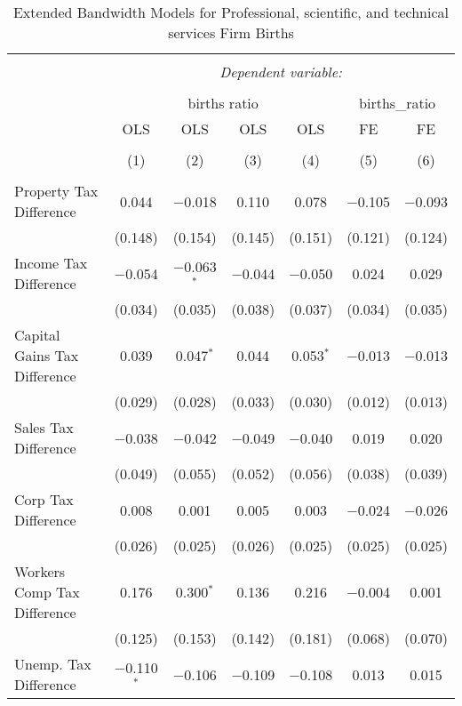 
\begin{table}[!htbp] \centering 
  \caption{Extended Bandwidth Models for  Professional, scientific, and technical services Firm Births} 
  \label{54eb} 
\begin{tabular}{@{\extracolsep{5pt}}lcccccc} 
\\[-1.8ex]\hline 
\hline \\[-1.8ex] 
 & \multicolumn{6}{c}{\textit{Dependent variable:}} \\ 
\cline{2-7} 
\\[-1.8ex] & \multicolumn{4}{c}{births ratio} & \multicolumn{2}{c}{births\_ratio} \\ 
 & OLS & OLS & OLS & OLS & FE & FE \\ 
\\[-1.8ex] & (1) & (2) & (3) & (4) & (5) & (6)\\ 
\hline \\[-1.8ex] 
 Property Tax Difference & 0.044 & $-$0.018 & 0.110 & 0.078 & $-$0.105 & $-$0.093 \\ 
  & (0.148) & (0.154) & (0.145) & (0.151) & (0.121) & (0.124) \\ 
  Income Tax Difference & $-$0.054 & $-$0.063$^{*}$ & $-$0.044 & $-$0.050 & 0.024 & 0.029 \\ 
  & (0.034) & (0.035) & (0.038) & (0.037) & (0.034) & (0.035) \\ 
  Capital Gains Tax Difference & 0.039 & 0.047$^{*}$ & 0.044 & 0.053$^{*}$ & $-$0.013 & $-$0.013 \\ 
  & (0.029) & (0.028) & (0.033) & (0.030) & (0.012) & (0.013) \\ 
  Sales Tax Difference & $-$0.038 & $-$0.042 & $-$0.049 & $-$0.040 & 0.019 & 0.020 \\ 
  & (0.049) & (0.055) & (0.052) & (0.056) & (0.038) & (0.039) \\ 
  Corp Tax Difference & 0.008 & 0.001 & 0.005 & 0.003 & $-$0.024 & $-$0.026 \\ 
  & (0.026) & (0.025) & (0.026) & (0.025) & (0.025) & (0.025) \\ 
  Workers Comp Tax Difference & 0.176 & 0.300$^{*}$ & 0.136 & 0.216 & $-$0.004 & 0.001 \\ 
  & (0.125) & (0.153) & (0.142) & (0.181) & (0.068) & (0.070) \\ 
  Unemp. Tax Difference & $-$0.110$^{*}$ & $-$0.106 & $-$0.109 & $-$0.108 & 0.013 & 0.015 \\ 

\end{tabular}
\end{table}
